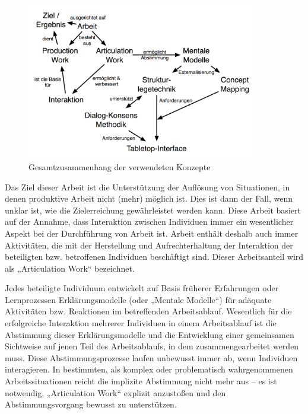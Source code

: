 \begin{figure}[htbp]
	\centering
	\includegraphics[width=0.9\textwidth]{img/Schlussbetrachtungen/ArbeitInteraktionMentaleModelleTabletop.png}
	\caption{Gesamtzusammenhang der verwendeten Konzepte}
	\label{fig:img_Schlussbetrachtungen_ArbeitInteraktionMentaleModelleTabletop}
\end{figure}

Das Ziel dieser Arbeit ist die Unterstützung der Auflösung von Situationen, in denen produktive Arbeit nicht (mehr) möglich ist. Dies ist dann der Fall, wenn unklar ist, wie die Zielerreichung gewährleistet werden kann. Diese Arbeit basiert auf der Annahme, dass Interaktion zwischen Individuen immer ein wesentlicher Aspekt bei der Durchführung von Arbeit ist. Arbeit enthält deshalb auch immer Aktivitäten, die mit der Herstellung und Aufrechterhaltung der Interaktion der beteiligten bzw. betroffenen Individuen beschäftigt sind. Dieser Arbeitsanteil wird als „Articulation Work“ bezeichnet. 

Jedes beteiligte Individuum entwickelt auf Basis früherer Erfahrungen oder Lernprozessen Erklärungsmodelle (oder „Mentale Modelle“) für adäquate Aktivitäten bzw. Reaktionen im betreffenden Arbeitsablauf. Wesentlich für die erfolgreiche Interaktion mehrerer Individuen in einem Arbeitsablauf ist die Abstimmung dieser Erklärungsmodelle und die Entwicklung einer gemeinsamen Sichtweise auf jenen Teil des Arbeitsablaufs, in dem zusammengearbeitet werden muss. Diese Abstimmungsprozesse laufen unbewusst immer ab, wenn Individuen interagieren. In bestimmten, als komplex oder problematisch wahrgenommenen Arbeitssituationen reicht die implizite Abstimmung nicht mehr aus -- es ist notwendig, „Articulation Work“ explizit anzustoßen und den Abstimmungsvorgang bewusst zu unterstützen. 

